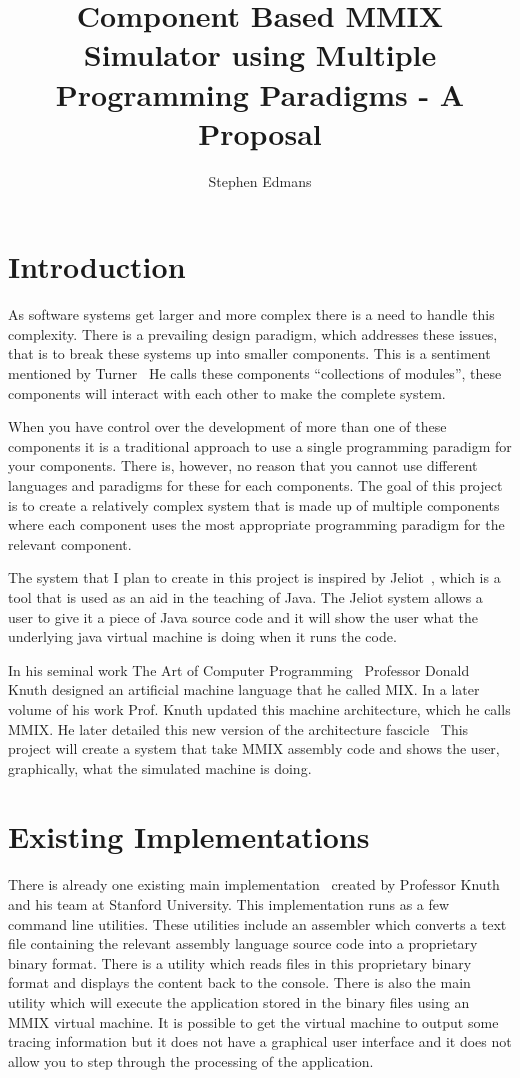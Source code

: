 \documentclass[11pt]{article} %
\title{Component Based MMIX Simulator using Multiple Programming Paradigms - A Proposal}
\author{Stephen Edmans}
\date{} %
\begin{document}
\maketitle
\newpage
\tableofcontents
\newpage
\listoffigures
\newpage
\section{Introduction}
As software systems get larger and more complex there is a need to handle this complexity. There is a prevailing design paradigm, which addresses these issues, that is to break these systems up into smaller components.  This is a sentiment mentioned by Turner~\cite{turner:why}  He calls these components ``collections of modules'', these components will interact with each other to make the complete system. 

When you have control over the development of more than one of these components it is a traditional approach to use a single programming paradigm for your components. There is, however, no reason that you cannot use different languages and paradigms for these for each components. The goal of this project is to create a relatively complex system that is made up of multiple components where each component uses the most appropriate programming paradigm for the relevant component.

The system that I plan to create in this project is inspired by Jeliot~\cite{jeliot:ref}, which is a tool that is used as an aid in the teaching of Java. The Jeliot system allows a user to give it a piece of Java source code and it will show the user what the underlying java virtual machine is doing when it runs the code.

In his seminal work The Art of Computer Programming~\cite{knuth:aocp1} Professor Donald Knuth designed an artificial machine language that he called MIX. In a later volume of his work Prof. Knuth updated this machine architecture, which he calls MMIX. He later detailed this new version of the architecture fascicle~\cite{knuth:aocp2} This project will create a system that take MMIX assembly code and shows the user, graphically, what the simulated machine is doing.

\section{Existing Implementations}
There is already one existing main implementation~\cite{knuth:mmix} created by Professor Knuth and his team at Stanford University. This implementation runs as a few command line utilities.  These utilities include an assembler which converts a text file containing the relevant assembly language source code into a proprietary binary format.  There is a utility which reads files in this proprietary binary format and displays the content back to the console.  There is also the main utility which will execute the application stored in the binary files using an MMIX virtual machine.  It is possible to get the virtual machine to output some tracing information but it does not have a graphical user interface and it does not allow you to step through the processing of the application.  
\end{document}
